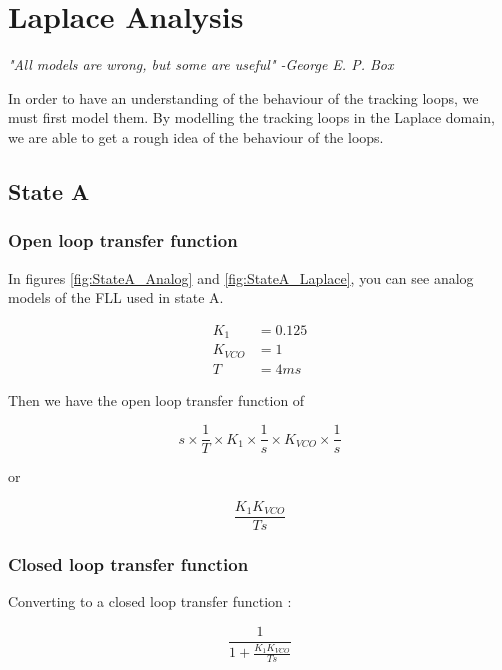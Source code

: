 \label{ch:LaplaceAnalysis}
\chapter{Laplace Analysis}

\emph{"All models are wrong, but some are useful" -George E. P. Box}

In order to have an understanding of the behaviour of the tracking loops, we must first model them. By modelling the tracking loops in the Laplace domain, we are able to get a rough idea of the behaviour of the loops. 



\section{State A}



\subsection{Open loop transfer function}
In figures \ref{fig:StateA_Analog} and \ref{fig:StateA_Laplace}, you can see analog models of the FLL used in state A. 

\begin{align*}
K_1 &= 0.125\\
K_{VCO} &= 1\\
T &= 4ms 
\end{align*}

Then we have the open loop transfer function of 

\begin{equation}
s \times \frac{1}{T} \times K_1 \times \frac{1}{s} \times  
K_{VCO} \times \frac{1}{s}
\end{equation}

or 

\begin{equation}
\frac{K_1 K_{VCO}}{T s}
\end{equation}

\subsection{Closed loop transfer function}
Converting to a closed loop transfer function :

\begin{equation}
\frac{1}{1+\frac{K_1 K_{VCO}}{T s}}
\end{equation}

